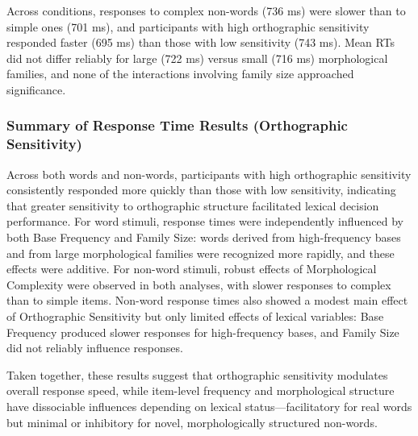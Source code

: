 \documentclass[preprint,12pt, authoryear, review]{elsarticle}
\begin{document}
		Across conditions, responses to complex non-words (736 ms) were slower than to simple ones (701 ms), and participants with high orthographic sensitivity responded faster (695 ms) than those with low sensitivity (743 ms). Mean RTs did not differ reliably for large (722 ms) versus small (716 ms) morphological families, and none of the interactions involving family size approached significance.

		
	\subsubsection{Summary of Response Time Results (Orthographic Sensitivity)}
		
	Across both words and non-words, participants with high orthographic sensitivity consistently responded more quickly than those with low sensitivity, indicating that greater sensitivity to orthographic structure facilitated lexical decision performance. For word stimuli, response times were independently influenced by both Base Frequency and Family Size: words derived from high-frequency bases and from large morphological families were recognized more rapidly, and these effects were additive. For non-word stimuli, robust effects of Morphological Complexity were observed in both analyses, with slower responses to complex than to simple items. Non-word response times also showed a modest main effect of Orthographic Sensitivity but only limited effects of lexical variables: Base Frequency produced slower responses for high-frequency bases, and Family Size did not reliably influence responses. 
	
	Taken together, these results suggest that orthographic sensitivity modulates overall response speed, while item-level frequency and morphological structure have dissociable influences depending on lexical status—facilitatory for real words but minimal or inhibitory for novel, morphologically structured non-words.
		
\end{document}
